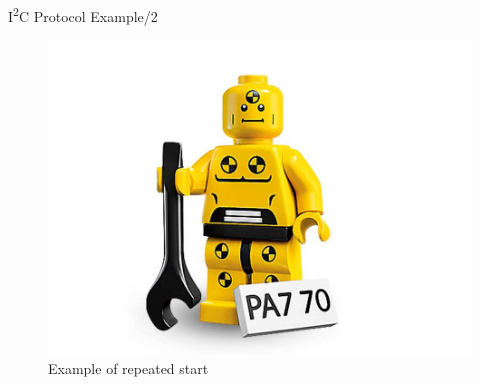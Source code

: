 \documentclass[]{beamer} %
\newcommand{\twi}{I\textsuperscript{2}C\xspace}
\newenvironment{changemargin}[2]
{
	\begin{list}{}
		{
			\setlength{\topsep}{0pt}
			\setlength{\leftmargin}{#1}
			\setlength{\rightmargin}{#2}
			\setlength{\listparindent}{\parindent}
		\setlength{\itemindent}{\parindent}
			\setlength{\parsep}{\parskip}
		}
	\item[]
	}
	{
	\end{list}
}
\begin{document}
\begin{frame}[fragile]{\twi Protocol Example/2}
\begin{changemargin}{-0.7cm}{+1cm}
\begin{figure}
				\includegraphics[width=\textwidth,height=0.8\textheight,keepaspectratio]{dummy}
				\caption{Example of repeated start}
			\end{figure}

			\vspace{5mm}



\end{changemargin}
\end{frame}
\end{document}
